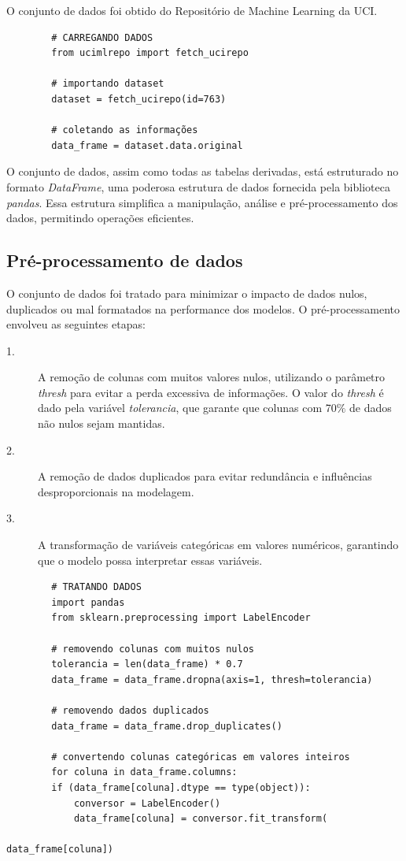 \documentclass[12pt,a4paper]{article}
\begin{document}
\quad\space O conjunto de dados foi obtido do Repositório de Machine Learning da UCI.

\begin{mdframed}
	\begin{verbatim}
		# CARREGANDO DADOS
		from ucimlrepo import fetch_ucirepo 
		
		# importando dataset
		dataset = fetch_ucirepo(id=763)
		
		# coletando as informações
		data_frame = dataset.data.original
	\end{verbatim}
\end{mdframed}
\vspace{0.15cm}
\quad\space O conjunto de dados, assim como todas as tabelas derivadas, está estruturado no formato \textit{DataFrame}, uma poderosa estrutura de dados fornecida pela biblioteca \textit{pandas}. Essa estrutura simplifica a manipulação, análise e pré-processamento dos dados, permitindo operações eficientes.

\subsection{Pré-processamento de dados}

\quad\space O conjunto de dados foi tratado para minimizar o impacto de dados nulos, duplicados ou mal formatados na performance dos modelos. O pré-processamento envolveu as seguintes etapas:

\begin{description}
	\item[1.] A remoção de colunas com muitos valores nulos, utilizando o parâmetro \textit{thresh} para evitar a perda excessiva de informações. O valor do \textit{thresh} é dado pela variável \textit{tolerancia}, que garante que colunas com 70$\%$ de dados não nulos sejam mantidas.
	\item[2.] A remoção de dados duplicados para evitar redundância e influências desproporcionais na modelagem.
	\item[3.] A transformação de variáveis categóricas em valores numéricos, garantindo que o modelo possa interpretar essas variáveis.
\end{description}

\begin{mdframed}
	\begin{verbatim}
		# TRATANDO DADOS
		import pandas
		from sklearn.preprocessing import LabelEncoder
		
		# removendo colunas com muitos nulos
		tolerancia = len(data_frame) * 0.7
		data_frame = data_frame.dropna(axis=1, thresh=tolerancia)
		
		# removendo dados duplicados
		data_frame = data_frame.drop_duplicates()
		
		# convertendo colunas categóricas em valores inteiros
		for coluna in data_frame.columns:
		if (data_frame[coluna].dtype == type(object)):
			conversor = LabelEncoder()
			data_frame[coluna] = conversor.fit_transform(
			     																															data_frame[coluna])
	\end{verbatim}
\end{mdframed}
\end{document}

